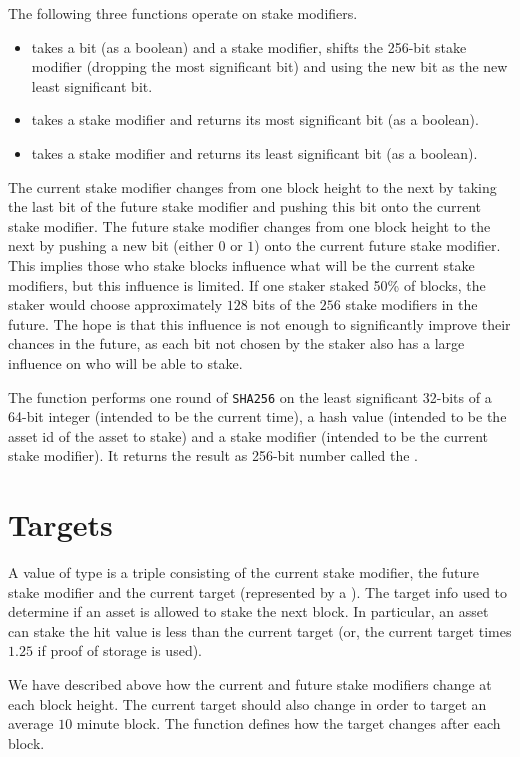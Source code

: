 The following three functions operate on stake modifiers.
\begin{itemize}
\item {} takes a bit (as a boolean) and a stake modifier, shifts the 256-bit stake modifier (dropping the most significant bit) and using the new bit as the new least significant bit.
\item {} takes a stake modifier and returns its most significant bit (as a boolean).
\item {} takes a stake modifier and returns its least significant bit (as a boolean).
\end{itemize}
The current stake modifier changes from one block height to the next by
taking the last bit of the future stake modifier and pushing this bit onto the current stake modifier.
The future stake modifier changes from one block height to the next by
pushing a new bit (either $0$ or $1$) onto the current future stake modifier.
This implies those who stake blocks influence what will be the current stake modifiers,
but this influence is limited. If one staker staked 50\% of blocks, the staker would
choose approximately $128$ bits of the $256$ stake modifiers in the future.
The hope is that this influence is not enough to significantly improve their
chances in the future, as each bit not chosen by the staker also has a large influence
on who will be able to stake.

The function {} performs one round of
{\tt{SHA256}} on the least significant 32-bits of a 64-bit integer (intended to be the current time),
a hash value (intended to be the asset id of the asset to stake) and a stake modifier (intended to be the current stake modifier).
It returns the result as 256-bit number called the {}.

\section{Targets}

A value of type {} is a triple
consisting of the current stake modifier,
the future stake modifier
and the current target (represented by a {}).
The target info used to determine if an asset
is allowed to stake the next block.
In particular, an asset can stake
the hit value is less than the current target (or, the current target times $1.25$
if proof of storage is used).

We have described above how the current and future stake modifiers
change at each block height.
The current target should also change in order to target an average $10$ minute
block. The function {} defines how the target changes
after each block.

